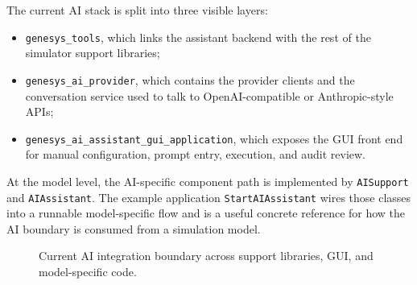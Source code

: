 The current AI stack is split into three visible layers:
\begin{itemize}
\item \texttt{genesys\_tools}, which links the assistant backend with the rest of the simulator support libraries;
\item \texttt{genesys\_ai\_provider}, which contains the provider clients and the conversation service used to talk to OpenAI-compatible or Anthropic-style APIs;
\item \texttt{genesys\_ai\_assistant\_gui\_application}, which exposes the GUI front end for manual configuration, prompt entry, execution, and audit review.
\end{itemize}

At the model level, the AI-specific component path is implemented by \texttt{AISupport} and \texttt{AIAssistant}. The example application \texttt{StartAIAssistant} wires those classes into a runnable model-specific flow and is a useful concrete reference for how the AI boundary is consumed from a simulation model.

\begin{figure}[htbp]
\centering
\caption{Current AI integration boundary across support libraries, GUI, and model-specific code.}
\label{fig:ai-integration-boundary-map}
\end{figure}

